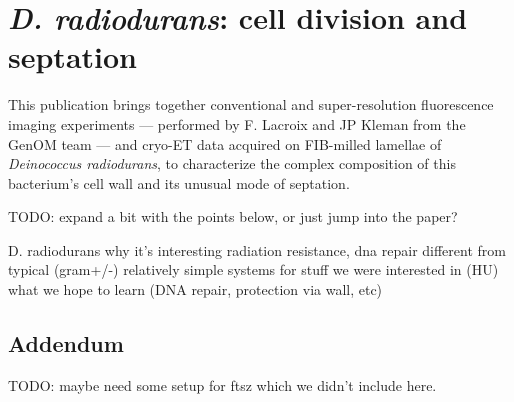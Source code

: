 \chapter{\textit{D. radiodurans}: cell division and septation}\label{drad}

This publication brings together conventional and super-resolution fluorescence imaging experiments --- performed by F. Lacroix and JP Kleman from the GenOM team --- and cryo-ET data acquired on FIB-milled lamellae of \textit{Deinococcus radiodurans}, to characterize the complex composition of this bacterium's cell wall and its unusual mode of septation.

TODO: expand a bit with the points below, or just jump into the paper?

\begin{outline}
\1 D. radiodurans
    \2 why it's interesting
        \3 radiation resistance, dna repair
        \3 different from typical (gram+/-)
        \3 relatively simple systems for stuff we were interested in (HU)
    \2 what we hope to learn (DNA repair, protection via wall, etc)
\end{outline}

\localtableofcontents
\newpage

\newpage

\section{Addendum}

TODO: maybe need some setup for ftsz which we didn't include here.
